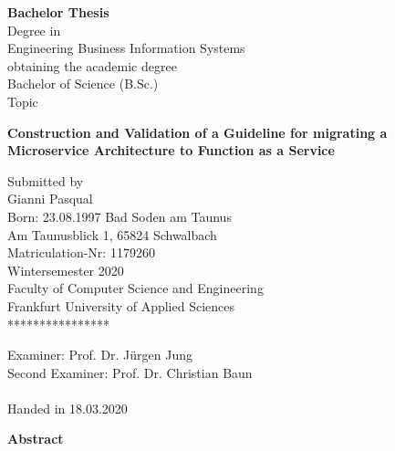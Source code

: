 \documentclass[a4paper,twoside,11pt, pagesize]{scrartcl}
\begin{document}
\begin{spacing}{1.2}
\begin{spacing}{1}
\begin{titlepage} 
  \begin{center} {\LARGE \textbf{Bachelor Thesis}}\\
     \vspace{1cm} Degree in\\
     {\large Engineering Business Information Systems}\\
     \vspace{1cm} obtaining the academic degree\\
     {\large Bachelor of Science (B.Sc.)}\\
     \vspace{1.5cm} Topic\\
     \begin{spacing}{1.3}
     \vspace{0.5cm} {\LARGE \textbf{Construction and Validation of a Guideline for migrating a Microservice Architecture to Function as a Service}}\\
     \end{spacing}
     \vspace{1cm} Submitted by\\
     \vspace{0.3cm} {\large Gianni Pasqual}\\
     \vspace{0.5cm} Born: 23.08.1997 Bad Soden am Taunus\\
     Am Taunusblick 1, 65824 Schwalbach\\
     \vspace{1.5cm} Matriculation-Nr: 1179260\\
     Wintersemester 2020 \\
     Faculty of Computer Science and Engineering\\
     Frankfurt University of Applied Sciences\\
     \vspace{0.5cm} **************** \vfill
  \end{center}
  {\large Examiner: Prof. Dr. Jürgen Jung}\\
  {\large Second Examiner: Prof. Dr. Christian Baun}\\\\
  Handed in 18.03.2020
\end{titlepage}
\end{spacing}
\newpage
{\Large \textbf {Abstract}}


\end{spacing}
\end{document}

